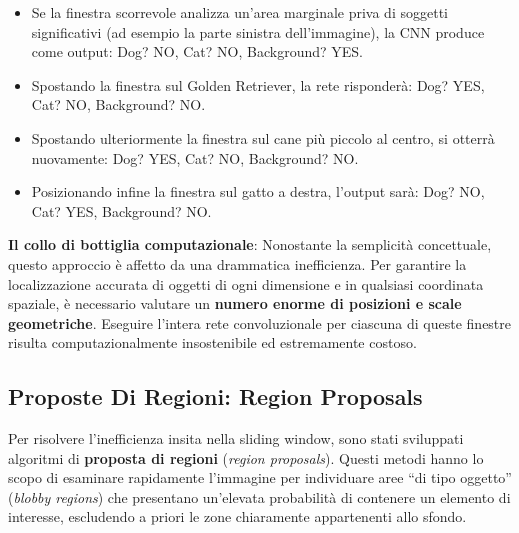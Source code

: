 ﻿\documentclass[11pt, a4paper]{article}
\begin{document}
\begin{itemize}[noitemsep]
    \item Se la finestra scorrevole analizza un'area marginale priva di soggetti significativi (ad esempio la parte sinistra dell'immagine), la CNN produce come output: Dog? NO, Cat? NO, Background? YES.
    \item Spostando la finestra sul Golden Retriever, la rete risponderà: Dog? YES, Cat? NO, Background? NO.
    \item Spostando ulteriormente la finestra sul cane più piccolo al centro, si otterrà nuovamente: Dog? YES, Cat? NO, Background? NO.
    \item Posizionando infine la finestra sul gatto a destra, l'output sarà: Dog? NO, Cat? YES, Background? NO.
\end{itemize}

\textbf{Il collo di bottiglia computazionale}: Nonostante la semplicità concettuale, questo approccio è affetto da una drammatica inefficienza. Per garantire la localizzazione accurata di oggetti di ogni dimensione e in qualsiasi coordinata spaziale, è necessario valutare un \textbf{numero enorme di posizioni e scale geometriche}. Eseguire l'intera rete convoluzionale per ciascuna di queste finestre risulta computazionalmente insostenibile ed estremamente costoso.


\newpage

\subsection{Proposte Di Regioni: Region Proposals}

Per risolvere l'inefficienza insita nella sliding window, sono stati sviluppati algoritmi di \textbf{proposta di regioni} (\emph{region proposals}). Questi metodi hanno lo scopo di esaminare rapidamente l'immagine per individuare aree ``di tipo oggetto'' (\emph{blobby regions}) che presentano un'elevata probabilità di contenere un elemento di interesse, escludendo a priori le zone chiaramente appartenenti allo sfondo.

\end{document}
